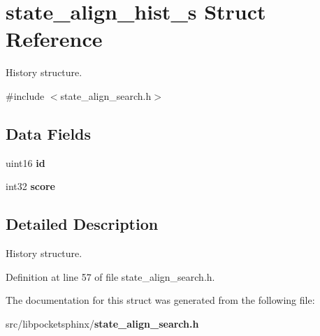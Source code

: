 \section{state\+\_\+align\+\_\+hist\+\_\+s Struct Reference}
\label{structstate__align__hist__s}


History structure.  




{\ttfamily \#include $<$state\+\_\+align\+\_\+search.\+h$>$}

\subsection*{Data Fields}
\begin{DoxyCompactItemize}
\item 
uint16 {\bfseries id}\label{structstate__align__hist__s_a74cb4b079e03059eb0b02cb17bcadb5e}

\item 
int32 {\bfseries score}\label{structstate__align__hist__s_aa8c7206b0491eefdfa2eaaf5a2834652}

\end{DoxyCompactItemize}


\subsection{Detailed Description}
History structure. 

Definition at line 57 of file state\+\_\+align\+\_\+search.\+h.



The documentation for this struct was generated from the following file\+:\begin{DoxyCompactItemize}
\item 
src/libpocketsphinx/{\bf state\+\_\+align\+\_\+search.\+h}\end{DoxyCompactItemize}
